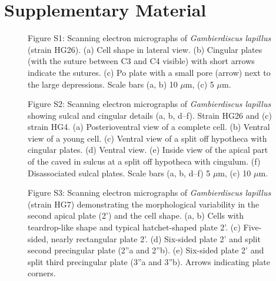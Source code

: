 \documentclass[12pt]{article}
\begin{document}
\section{Supplementary Material}
\FloatBarrier 
\begin{figure} 
\caption{Figure S1: Scanning electron micrographs of \textit{Gambierdiscus lapillus} (strain HG26). (a) Cell shape in lateral view. (b) Cingular plates (with the suture between C3 and C4 visible) with short arrows indicate the sutures. (c) Po plate with a small pore (arrow) next to the large depressions. Scale bars (a, b) 10 $\mu$m, (c) 5 $\mu$m.} 
\label{fig:s1SEM}
\end{figure} 
\FloatBarrier

\FloatBarrier 
\begin{figure} 
\caption{Figure S2: Scanning electron micrographs of \textit{Gambierdiscus lapillus} showing sulcal and cingular details (a, b, d–f). Strain HG26 and (c) strain HG4. (a) Posterioventral view of a complete cell. (b) Ventral view of a young cell. (c) Ventral view of a split off hypotheca with cingular plates. (d) Ventral view. (e) Inside view of the apical part of the caved in sulcus at a split off hypotheca with cingulum. (f) Disassociated sulcal plates. Scale bars (a, b, d–f) 5 $\mu$m, (c) 10 $\mu$m.} 
\label{fig:s2SEM}
\end{figure} 
\FloatBarrier

\FloatBarrier 
\begin{figure} 
\caption{Figure S3: Scanning electron micrographs of \textit{Gambierdiscus lapillus} (strain HG7) demonstrating the morphological variability in the second apical plate (2') and the cell shape. (a, b) Cells with teardrop-like shape and typical hatchet-shaped plate 2'. (c) Five-sided, nearly rectangular plate 2'. (d) Six-sided plate 2' and split second precingular plate (2''a and 2''b). (e) Six-sided plate 2' and split third precingular plate (3''a and 3''b). Arrows indicating plate corners.} 
\label{fig:s3SEM}
\end{figure} 
\FloatBarrier
\newpage


\end{document}
